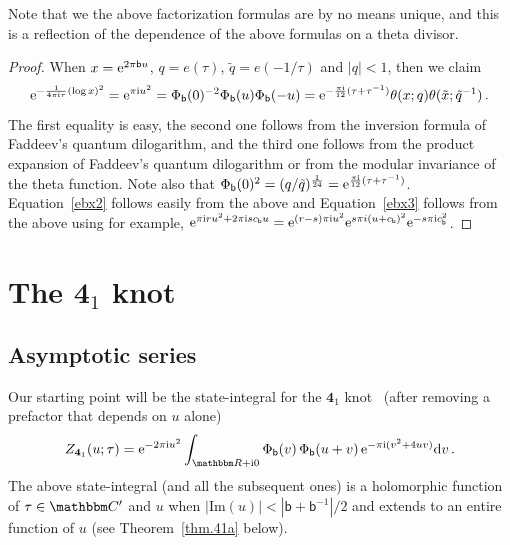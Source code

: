 \documentclass[12pt,reqno]{amsart}
\theoremstyle{definition}
\def\BR{\mathbbm R}
\def\BC{\mathbbm C}
\def\tq{\tilde{q}}
\def\tx{\tilde{x}}
\def\th{\theta}
\def\bb{\mathsf{b}}
\def\ri{\mathrm{i}}
\def\rd{\mathrm{d}}
\def\tx{\tilde{x}}
\def\re{{\rm e}}
\def\ri{{\rm i}}
\def\rd{{\rm d}}
\def\Im{\mathrm{Im}}
\def\md{\mathbf}
\newcommand{\knot}[1]{\md{#1}}
\begin{document}
Note that we the above factorization formulas are by no means unique,
and this is a reflection of the dependence of the above formulas on a
theta divisor.

\begin{proof}
  When $x=\re^{2\pi \bb u}$, $q=e(\tau)$, $\tq=e(-1/\tau)$ and
  $|q|<1$, then we claim
  \begin{equation}
    \label{ebx}
    \re^{-\frac{1}{4\pi \ri \tau} (\log x)^2} = \re^{\pi \ri u^2}
    = \Phi_\bb(0)^{-2} \Phi_\bb(u) \Phi_\bb(-u)
    = \re^{-\frac{\pi \ri}{12}(\tau+\tau^{-1})} \th(x;q)\th(\tx;\tq^{-1}) \,.
  \end{equation}
  The first equality is easy, the second one follows from the
  inversion formula of Faddeev's quantum dilogarithm, and the third one
  follows from the product expansion of Faddeev's quantum dilogarithm
  or from the modular invariance of the theta function. Note also that
  $\Phi_\bb(0)^2=(q/\tq)^{\frac{1}{24}}=\re^{\frac{\pi
      \ri}{12}(\tau+\tau^{-1})}$.  Equation~\eqref{ebx2} follows
  easily from the above and Equation~\eqref{ebx3} follows from the
  above using for example,
  $ \re^{\pi \ri r u^2 + 2 \pi \ri s c_\bb u} = \re^{(r-s)\pi \ri
    u^2}\re^{s\pi i(u+c_\bb)^2}\re^{-s\pi \ri c_\bb^2}$.
\end{proof}


\section{The $\knot{4}_1$ knot}
\label{sec.41}

\subsection{Asymptotic series}
\label{sub.41asy}

Our starting point will be the state-integral for the $\knot{4}_1$
knot~\cite[Eqn.38]{AK} (after removing a prefactor that depends on $u$
alone)
\begin{equation}
  \label{Z41x}
  Z_{\knot{4}_1}(u;\tau) =
  \re^{-2 \pi \ri u^2} \int_{\BR+\ri 0}  \Phi_\bb(v) \, \Phi_\bb(u+v)
  \, \re^{-\pi \ri (v^2+4uv)} \rd v \,.
\end{equation}
The above state-integral (and all the subsequent ones) is a
holomorphic function of $\tau \in \BC'$ and $u$ when
$|\Im(u)| < |\bb+\bb^{-1}|/2$ and extends to an entire function of
$u$ (see Theorem~\ref{thm.41a} below).
\end{document}
